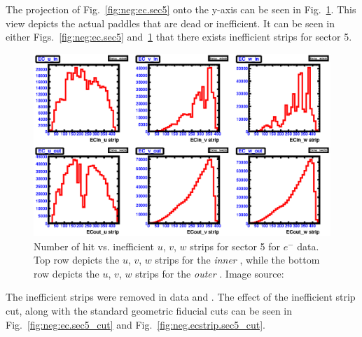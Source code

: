 %
The projection of Fig.~\ref{fig:neg:ec.sec5} onto the y-axis can be seen in Fig.~\ref{fig:neg.ecstrip.sec5}. This view depicts the actual paddles that are dead or inefficient. It can be seen in either Figs.~\ref{fig:neg:ec.sec5} and~\ref{fig:neg.ecstrip.sec5} that there exists inefficient  strips for sector 5. 
\begin{figure}[h!]\begin{center}
\includegraphics[width=\figwidth,height=\hfigheight]{figures/calib/ec/pim_ecuvw_NOKnockout_sec5.eps}
\caption[Number of hit vs. inefficient  $u$, $v$, $w$ strips for sector 5 for $e^-$ data]{\label{fig:neg.ecstrip.sec5} Number of hit vs. inefficient  $u$, $v$, $w$ strips for sector 5 for $e^-$ data. Top row depicts the $u$, $v$, $w$  strips for the \emph{inner} , while the bottom row depicts the $u$, $v$, $w$  strips for the \emph{outer} . Image source:~\cite{clas.thesis.kunkel}}
\end{center}\end{figure}
The inefficient strips were removed in data and . The effect of the inefficient strip cut, along with the standard   geometric fiducial cuts can be seen in Fig.~\ref{fig:neg:ec.sec5_cut} and Fig.~\ref{fig:neg.ecstrip.sec5_cut}.
%
